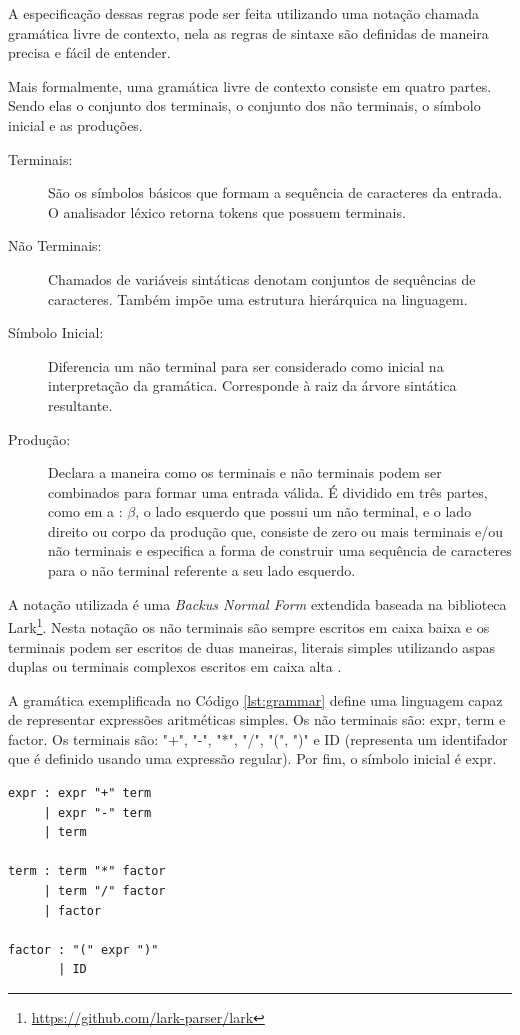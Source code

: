 A especificação dessas regras pode ser feita utilizando uma notação chamada gramática 
livre de contexto, nela as regras de sintaxe são definidas de 
maneira precisa e fácil de entender.

Mais formalmente, uma gramática livre de contexto consiste em quatro partes. Sendo elas
o conjunto dos terminais, o conjunto dos não terminais, o símbolo inicial e as produções.

\begin{description}
    \item[Terminais:] São os símbolos básicos que formam a sequência de 
    caracteres da entrada. O analisador léxico retorna tokens que possuem terminais. 
    \item [Não Terminais:] Chamados de variáveis sintáticas denotam conjuntos 
    de sequências de caracteres. Também impõe uma estrutura hierárquica na linguagem.
    \item[Símbolo Inicial:] Diferencia um não terminal para ser considerado 
    como inicial na interpretação da gramática. Corresponde à raiz da árvore sintática
    resultante.
    \item[Produção:] Declara a maneira como os terminais e não terminais 
    podem ser combinados para formar uma entrada válida. É dividido em três partes,
    como em a : $\beta$, o lado esquerdo que possui um não terminal, e o lado direito 
    ou corpo da produção que, consiste de zero ou mais terminais e/ou não terminais e especifica
    a forma de construir uma sequência de caracteres para o não terminal referente a seu lado esquerdo.
\end{description}

A notação utilizada é uma \textit{Backus Normal Form} extendida baseada na 
biblioteca Lark\footnote{\url{https://github.com/lark-parser/lark}}. Nesta notação os não 
terminais são sempre escritos em caixa baixa e os terminais podem ser escritos de duas 
maneiras, literais simples utilizando aspas duplas ou terminais complexos escritos em caixa alta \cite{lark}.

A gramática exemplificada no Código \ref{lst:grammar} define uma linguagem capaz de representar 
expressões aritméticas simples. Os não terminais são: expr, term e factor. 
Os terminais são: "+", "-", "*", "/", "(", ")" e ID (representa um identifador que é definido usando
uma expressão regular). Por fim, o símbolo inicial é expr.

\begin{lstlisting}[caption=Exemplo de gramática livre do contexto que descreve expressões
    aritméticas como (20 + 1) * 2.,label={lst:grammar}]
expr : expr "+" term 
     | expr "-" term
     | term

term : term "*" factor
     | term "/" factor
     | factor

factor : "(" expr ")"
       | ID
\end{lstlisting}

